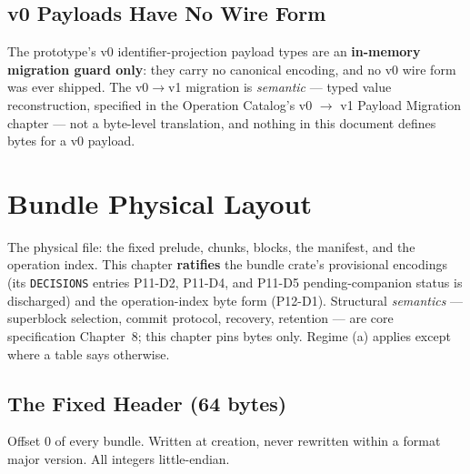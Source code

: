 \documentclass[11pt,letterpaper]{report}
\newcommand{\sectionsc}[1]{{\addfontfeatures{Letters=SmallCaps}#1}}
\begin{document}
\section{v0 Payloads Have No Wire Form}
\label{sec:ops:v0}

The prototype's v0 identifier-projection payload types are an
\textbf{in-memory migration guard only}: they carry no canonical encoding,
and no v0 wire form was ever shipped. The v0${\to}$v1 migration is
\emph{semantic} --- typed value reconstruction, specified in the Operation
Catalog's \sectionsc{v0 $\rightarrow$ v1 Payload Migration} chapter --- not a
byte-level translation, and nothing in this document defines bytes for a v0
payload.

\chapter{Bundle Physical Layout}
\label{ch:bundle}

The physical file: the fixed prelude, chunks, blocks, the manifest, and the
operation index. This chapter \textbf{ratifies} the bundle crate's
provisional encodings (its \texttt{DECISIONS} entries P11-D2, P11-D4, and
P11-D5 pending-companion status is discharged) and the operation-index
byte form (P12-D1). Structural \emph{semantics} --- superblock selection,
commit protocol, recovery, retention --- are core specification Chapter~8;
this chapter pins bytes only. Regime (a) applies except where a table says
otherwise.

\section{The Fixed Header (64 bytes)}
\label{sec:bundle:header}

Offset 0 of every bundle. Written at creation, never rewritten within a
format major version. All integers little-endian.
\end{document}
